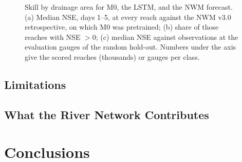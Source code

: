 \begin{figure}
\caption{Skill by drainage area for M0, the LSTM, and the NWM forecast. (a) Median NSE, days 1--5, at every reach against the NWM v3.0 retrospective, on which M0 was pretrained; (b) share of those reaches with NSE $> 0$; (c) median NSE against observations at the evaluation gauges of the random hold-out. Numbers under the axis give the scored reaches (thousands) or gauges per class.}
\label{fig:area-skill}
\end{figure}

\subsection{Limitations}
\label{sec:limits}

\subsection{What the River Network Contributes}
\label{sec:synthesis}

\section{Conclusions}
\label{sec:conclusions}
